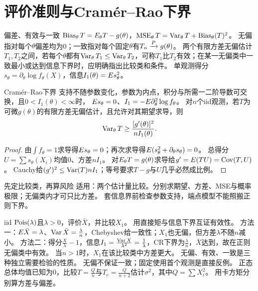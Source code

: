 \section{评价准则与Cramér--Rao下界}\label{sec:72}
\begin{definition}{偏差、有效与一致}
$\operatorname{Bias}_\theta T=E_\theta T-g(\theta)$，$\operatorname{MSE}_\theta T=\operatorname{Var}_\theta T+\operatorname{Bias}_\theta(T)^2$。
无偏指对每个$\theta$偏差均为0；一致指对每个固定$\theta$有$T_n\xrightarrow{P} g(\theta)$。
两个有限方差无偏估计$T_1,T_2$之间，若每个$\theta$都有$\operatorname{Var}_\theta T_1\le\operatorname{Var}_\theta T_2$，可称$T_1$比$T_2$有效；在某一无偏类中一致最小或达到信息下界时，应明确指出比较类和条件。
单观测得分$s_\theta=\partial_\theta\log f_\theta(X)$，信息$I_1(\theta)=E s_\theta^2$。
\end{definition}
\begin{theorem}{Cramér--Rao下界}
支持不随参数变化，参数为内点，积分与所需一二阶导数可交换，且$0<I_1(\theta)<\infty$时，
$E s_\theta=0$、$I_1=-E\partial_\theta^2\log f_\theta$。
对$n$个iid观测，若$T$为可微$g(\theta)$的有限方差无偏估计，且允许对其期望求导，则
\[\operatorname{Var}_\theta T\ge\dfrac{[g'(\theta)]^2}{nI_1(\theta)}.\]
\end{theorem}
\begin{proof}
由$\int f_\theta=1$求导得$E s_\theta=0$；再次求导得$E(s_\theta^2+\partial_\theta s_\theta)=0$。
总得分$U=\sum s_\theta(X_i)$均值0、方差$nI_1$。
对$E_\theta T=g(\theta)$求导给$g'=E(TU)=\operatorname{Cov}(T,U)$。
Cauchy给$(g')^2\le\operatorname{Var}(T)nI_1$；等号要求$T-g$与$U$几乎必然成比例。
\end{proof}
\begin{method}{先定比较类，再算风险}
适用：两个估计量比较。分别求期望、方差、MSE与概率极限；无偏类内才可只比方差。
套信息界前检查参数支持，端点模型不能照搬正则下界。
\end{method}
{iid $\operatorname{Pois}(\lambda)$且$\lambda>0$，评价$\bar X$，并比较$X_1$。}
{用直接矩与信息下界互证有效性。}
{方法一：$E\bar X=\lambda$、$\operatorname{Var}\bar X=\frac{\lambda}{n}$，Chebyshev给一致性；$X_1$也无偏，但方差$\lambda$不随$n$减小。
方法二：得分$\frac{X}{\lambda}-1$，信息$I_1=\frac{\operatorname{Var} X}{\lambda^2}=\frac{1}{\lambda}$，CR下界为$\frac{\lambda}{n}$，$\bar X$达到，故在正则无偏类中有效。
当$n>1$时，$X_1$在该比较类中方差更大。}
{无偏、有效、一致是三种独立需要检验的性质。}
{无偏不保证一致；固定使用首个观测是直接反例。}
{正态总体均值已知为0，比较$T=\frac{Q}{n}$与$T_c=\frac{Q}{n+2}$估计$\sigma^2$，其中$Q=\sum X_i^2$。}
{用卡方矩分别算方差与偏差。}
